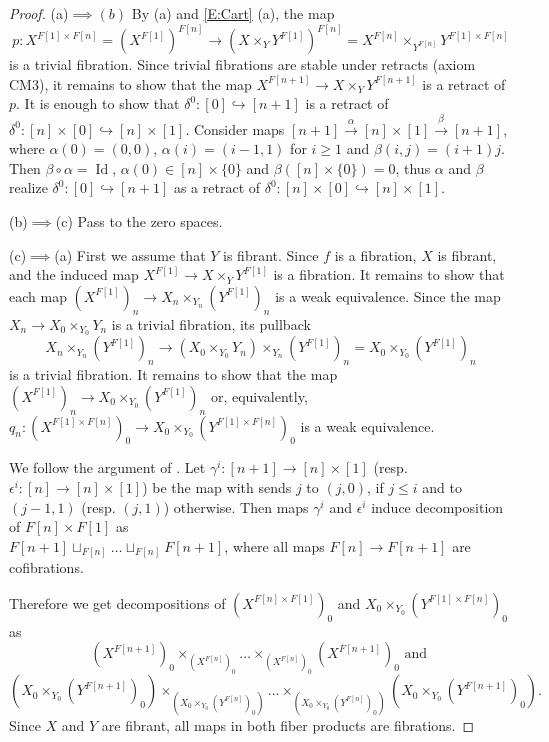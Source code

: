 \documentclass[12pt]{amsart}
\theoremstyle{plain}
\theoremstyle{definition}
\numberwithin{equation}{section}
\newcommand{\lra}{\longrightarrow}
\newcommand{\hra}{\hookrightarrow}
\newcommand{\gm}{\gamma}
\newcommand{\dt}{\delta}
\newcommand{\al}{\alpha}
\newcommand{\re}[1]{\ref{E:#1}}
\newcommand{\Id}{\operatorname{Id}}
\begin{document}
\begin{proof}
(a)$\implies(b)$ By (a) and \re{Cart} (a), the map
%
\[
p:X^{F[1]\times F[n]}=(X^{F[1]})^{F[n]}\to (X\times_Y
Y^{F[1]})^{F[n]}=X^{F[n]}\times_{Y^{F[n]}}Y^{F[1]\times F[n]}
\]
%
is a trivial fibration. Since trivial fibrations are stable under
retracts (axiom CM3), it remains to show that the map
$X^{F[n+1]}\to X\times_Y Y^{F[n+1]}$ is a retract of $p$. It is
enough to show that  $\dt^0:[0]\hra[n+1]$ is a retract of
$\dt^0:[n]\times [0]\hra [n]\times [1]$. Consider maps
$[n+1]\overset{\al}{\lra} [n]\times[1]\overset{\beta}{\lra}
[n+1]$, where $\al(0)=(0,0)$, $\al(i)=(i-1,1)$ for $i\geq 1$ and 
$\beta(i,j)=(i+1)j$. Then $\beta\circ\al=\Id$, $\al(0)\in
[n]\times\{0\}$ and $\beta([n]\times\{0\})=0$, thus $\al$ and
$\beta$ realize $\dt^0:[0]\hra[n+1]$ as a retract of $\dt^0:[n]\times
[0]\hra[n]\times [1]$.

(b)$\implies$(c) Pass to the zero spaces.

(c)$\implies$(a) First we assume that $Y$ is fibrant. Since $f$ is
a fibration, $X$ is fibrant, and the induced map $X^{F[1]}\to
X\times_Y Y^{F[1]}$ is a fibration. It remains to show that each
map $(X^{F[1]})_n\to X_n\times_{Y_n} (Y^{F[1]})_n$ is a weak
equivalence. Since the map $X_n\to X_0\times_{Y_0} Y_n$ is a
trivial fibration, its pullback 
\[
X_n\times_{Y_n} (Y^{F[1]})_n\to (X_0\times_{Y_0} Y_n)\times_{Y_n}
(Y^{F[1]})_n=X_0\times_{Y_0}(Y^{F[1]})_n
\]
is a trivial fibration. It remains to show that the map
$(X^{F[1]})_n\to X_0\times_{Y_0}(Y^{F[1]})_n$ or, equivalently,
$q_n:(X^{F[1]\times F[n]})_0\to X_0\times_{Y_0}(Y^{F[1]\times
F[n]})_0$ is a weak equivalence.

We follow the argument of \cite[Lem 10.3]{Re}. Let $\gm^i:[n+1]\to
[n]\times[1]$ (resp. $\epsilon^i:[n]\to [n]\times[1]$) be the map
with sends $j$ to $(j,0)$, if $j\leq i$ and to $(j-1,1)$ (resp.
$(j,1)$) otherwise. Then maps $\gm^i$ and $\epsilon^i$ induce 
decomposition of  $F[n]\times F[1]$ as \\
$F[n+1]\sqcup_{F[n]}\ldots\sqcup_{F[n]} F[n+1]$, where all maps
$F[n]\to F[n+1]$ are cofibrations.

Therefore we get decompositions of $(X^{F[n]\times F[1]})_0$ and
$X_0\times_{Y_0}(Y^{F[1]\times F[n]})_0$ as
\[(X^{F[n+1]})_0\times_{(X^{F[n]})_0}\ldots\times_{(X^{F[n]})_0}(X^{F[n+1]})_0\text{ and }\]
\[
(X_0\times_{Y_0}(Y^{F[n+1]})_0)\times_{(X_0\times_{Y_0}(Y^{F[n]})_0)}
\ldots\times_{(X_0\times_{Y_0}(Y^{F[n]})_0)}
(X_0\times_{Y_0}(Y^{F[n+1]})_0).
\]
Since $X$ and $Y$ are fibrant, all maps in
both fiber products are fibrations.


\end{proof}
\end{document}
